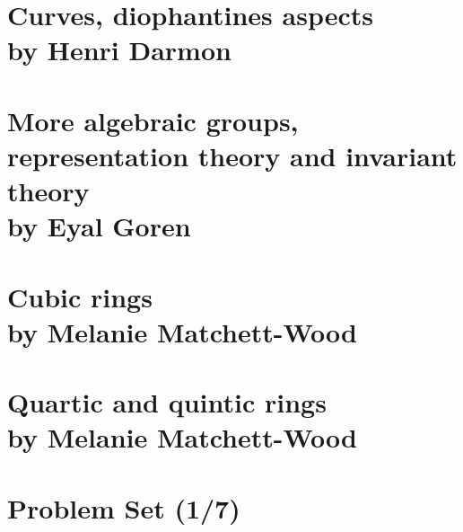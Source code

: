 \documentclass[12pt,amsfont]{amsart}
\begin{document}
\newpage
\renewcommand{\thesubsection}{\arabic{section}.\arabic{subsection}}
\section{Curves, diophantines aspects\\ by Henri Darmon
}\label{7}

\newpage
\renewcommand{\thesubsection}{\arabic{section}.\arabic{subsection}}
\section{More algebraic groups, representation theory and invariant theory\\ by  Eyal Goren}\label{8}


\newpage
\renewcommand{\thesubsection}{\arabic{section}.\arabic{subsection}}
\section{Cubic rings\\ by  Melanie Matchett-Wood}\label{9}

\newpage
\renewcommand{\thesubsection}{\arabic{section}.\arabic{subsection}}
\section{Quartic and quintic rings\\ by  Melanie Matchett-Wood}\label{10}

\newpage
\section{Problem Set (1/7)}\label{11}
\end{document}
